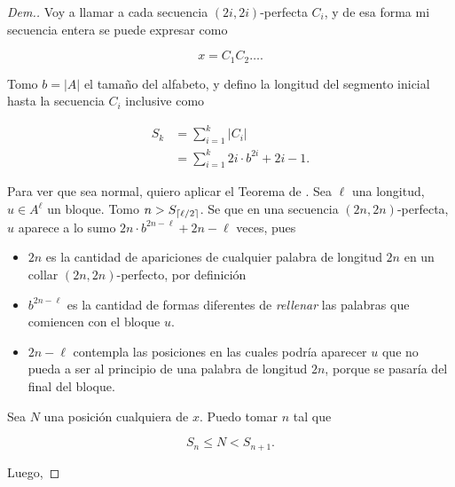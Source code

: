 \documentclass{article}
\DeclarePairedDelimiter\ceil{\lceil}{\rceil}
\theoremstyle{definition} %
\begin{document}
\begin{proof}[Dem.]
Voy a llamar a cada secuencia $(2i, 2i)$-perfecta $C_i$, y de esa forma mi
secuencia entera se puede expresar como

$$x = C_1 C_2 \dots.$$

Tomo $b = |A|$ el tamaño del alfabeto, y defino la longitud del segmento inicial
hasta la secuencia $C_i$ inclusive como

\begin{align*}
    S_k &= \sum_{i=1}^{k} |C_i| \\
        &= \sum_{i=1}^{k} 2i \cdot b^{2i} + 2i - 1.
\end{align*}

Para ver que sea normal, quiero aplicar el Teorema de
. Sea $\ell$ una longitud, $u \in A^\ell$ un
bloque. Tomo $n > S_{\ceil{\ell/2}}$. Se que en una secuencia $(2n,
2n)$-perfecta, $u$ aparece a lo sumo $2n \cdot b^{2n -\ell} + 2n - \ell$ veces,
pues

\begin{itemize}
    \item $2n$ es la cantidad de apariciones de cualquier palabra de longitud
    $2n$ en un collar $(2n, 2n)$-perfecto, por definición
    \item $b^{2n -\ell}$ es la cantidad de formas diferentes de
    \textit{rellenar} las palabras que comiencen con el bloque $u$.
    \item $2n - \ell$ contempla las posiciones en las cuales podría aparecer $u$
    que no pueda a ser al principio de una palabra de longitud $2n$, porque se
    pasaría del final del bloque.
\end{itemize}


Sea $N$ una posición cualquiera de $x$. Puedo tomar $n$ tal que

\[S_n \leq N < S_{n+1}.\]

Luego,


\end{proof}
\end{document}
